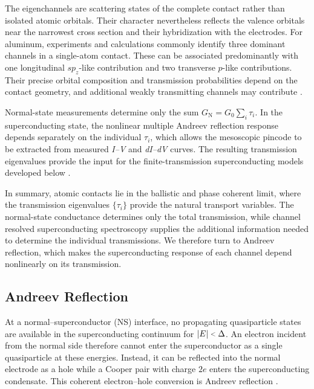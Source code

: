             The eigenchannels are scattering states of the complete contact rather than isolated atomic orbitals. Their character nevertheless reflects the valence orbitals near the narrowest cross section and their hybridization with the electrodes. For aluminum, experiments and calculations commonly identify three dominant channels in a single-atom contact. These can be associated predominantly with one longitudinal $sp_z$-like contribution and two transverse $p$-like contributions. Their precise orbital composition and transmission probabilities depend on the contact geometry, and additional weakly transmitting channels may contribute \cite{scheer_conduction_1997,scheer_signature_1998}.

            Normal-state measurements determine only the sum $G_\mathrm{N}=G_0\sum_i\tau_i$. In the superconducting state, the nonlinear multiple Andreev reflection response depends separately on the individual $\tau_i$, which allows the mesoscopic pincode to be extracted from measured \textit{I--V} and \textit{dI--dV} curves. The resulting transmission eigenvalues provide the input for the finite-transmission superconducting models developed below \cite{scheer_conduction_1997,scheer_signature_1998}.

        In summary, atomic contacts lie in the ballistic and phase coherent limit, where the transmission eigenvalues $\{\tau_i\}$ provide the natural transport variables. The normal-state conductance determines only the total transmission, while channel resolved superconducting spectroscopy supplies the additional information needed to determine the individual transmissions. We therefore turn to Andreev reflection, which makes the superconducting response of each channel depend nonlinearly on its transmission.

    \subsection{Andreev Reflection}
    \label{subsec:meso:ar}

        At a normal--superconductor (NS) interface, no propagating quasiparticle states are available in the superconducting continuum for $|E|\slt{}\Delta$. An electron incident from the normal side therefore cannot enter the superconductor as a single quasiparticle at these energies. Instead, it can be reflected into the normal electrode as a hole while a Cooper pair with charge $2e$ enters the superconducting condensate. This coherent electron--hole conversion is Andreev reflection \cite{andreev_thermal_1964}.

